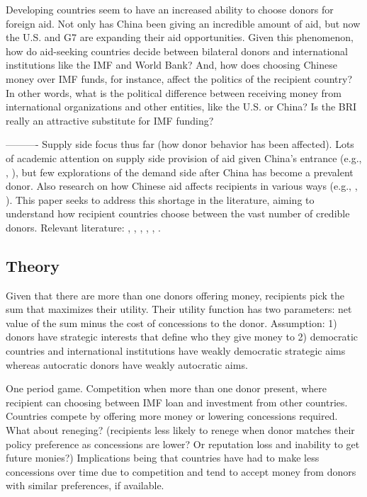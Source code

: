 Developing countries seem to have an increased ability to choose donors for foreign aid. Not only has China been giving an incredible amount of aid, but now the U.S. and G7 are expanding their aid opportunities. Given this phenomenon, how do aid-seeking countries decide between bilateral donors and international institutions like the IMF and World Bank? And, how does choosing Chinese money over IMF funds, for instance, affect the politics of the recipient country? In other words, what is the political difference between receiving money from international organizations and other entities, like the U.S. or China? Is the BRI really an attractive substitute for IMF funding?

----------
Supply side focus thus far (how donor behavior has been affected).
Lots of academic attention on supply side provision of aid given China's entrance (e.g., , \cite{dreher2015}), but few explorations of the demand side after China has become a prevalent donor. Also research on how Chinese aid affects recipients in various ways (e.g., \cite{martorano2020}, \cite{bader2015}).
This paper seeks to address this shortage in the literature, aiming to understand how recipient countries choose between the vast number of credible donors. Relevant literature: \cite{kilama2016a}, \cite{hernandez2017}, \cite{li2017a}, \cite{isaksson2018}, \cite{humphrey2019}, \cite{broich2017a}.

\subsection*{Theory} 
Given that there are more than one donors offering money, recipients pick the sum that maximizes their utility. Their utility function has two parameters: net value of the sum minus the cost of concessions to the donor. Assumption: 1) donors have strategic interests that define who they give money to 2) democratic countries and international institutions have weakly democratic strategic aims whereas autocratic donors have weakly autocratic aims. 

One period game. Competition when more than one donor present, where recipient can choosing between IMF loan and investment from other countries. Countries compete by offering more money or lowering concessions required. What about reneging? (recipients less likely to renege when donor matches their policy preference as concessions are lower? Or reputation loss and inability to get future monies?)  Implications being that countries have had to make less concessions over time due to competition and tend to accept money from donors with similar preferences, if available.

